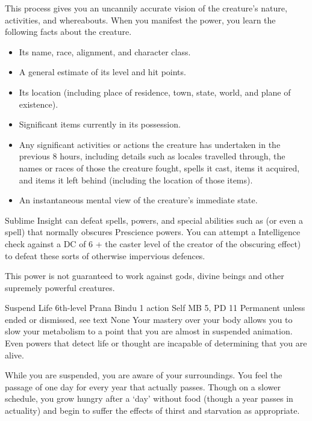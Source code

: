 This process gives you an uncannily accurate vision
of the creature's nature,
activities,
and whereabouts.
When you manifest the power,
you learn the following facts about the creature.
\begin{itemize}
  \item Its name, race, alignment, and character class.
  \item A general estimate of its level and hit points.
  \item Its location (including place of residence, town,
        state, world, and plane of existence).
  \item Significant items currently in its possession.
  \item Any significant activities or actions the creature
        has undertaken in the previous 8 hours,
        including details such as locales travelled through,
        the names or races of those the creature fought,
        spells it cast,
        items it acquired,
        and items it left behind
        (including the location of those items).
  \item An instantaneous mental view of the creature's
        immediate state.
\end{itemize}

Sublime Insight can defeat spells,
powers,
and special abilities such as 
(or even a  spell)
that normally obscures Prescience powers.
You can attempt a Intelligence check against
a DC of 6 + the caster level of the
creator of the obscuring effect)
to defeat these sorts of otherwise impervious defences.

This power is not guaranteed to work against gods, divine beings
and other supremely powerful creatures.

\DndPowerHeader%
    {Suspend Life\label{pwr:suspend_life}}
    {6th-level Prana Bindu}
    {1 action}
    {Self}
    {MB 5, PD 11}
    {Permanent unless ended or dismissed, see text}
    {None}
Your mastery over your body allows you to
slow your metabolism to a point that you are almost in suspended
animation. Even powers that detect life or thought are incapable
of determining that you are alive.

While you are suspended, you are aware of your surroundings.
You feel the passage of one day for every year that actually
passes. Though on a slower schedule, you grow hungry after
a `day' without food (though a year passes in actuality)
and begin to suffer the effects of thirst and starvation as
appropriate.

